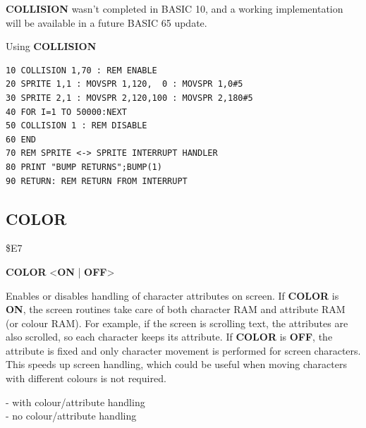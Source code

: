 \begin{description}[leftmargin=2cm,style=nextline]
\item [Info:] {\bf COLLISION} wasn't completed in BASIC 10, and
               a working implementation will be available in a future BASIC 65 update.


\item [Example:] Using {\bf COLLISION}
\begin{tcolorbox}[colback=black,coltext=white]
\verbatimfont{\codefont}
\begin{verbatim}
10 COLLISION 1,70 : REM ENABLE
20 SPRITE 1,1 : MOVSPR 1,120,  0 : MOVSPR 1,0#5
30 SPRITE 2,1 : MOVSPR 2,120,100 : MOVSPR 2,180#5
40 FOR I=1 TO 50000:NEXT
50 COLLISION 1 : REM DISABLE
60 END
70 REM SPRITE <-> SPRITE INTERRUPT HANDLER
80 PRINT "BUMP RETURNS";BUMP(1)
90 RETURN: REM RETURN FROM INTERRUPT
\end{verbatim}
\end{tcolorbox}
\end{description}


\newpage
\subsection{COLOR}
\begin{description}[leftmargin=2cm,style=nextline]
\item [Token:] \$E7
\item [Format:] {\bf COLOR} <{\bf ON} | {\bf OFF}>
\item [Usage:] Enables or disables
               handling of character attributes on screen.
               If {\bf COLOR} is {\bf ON}, the screen routines
               take care of both character RAM and attribute RAM (or colour RAM).
               For example, if the screen is scrolling text, the attributes
               are also scrolled, so each character keeps its attribute.
               If {\bf COLOR} is {\bf OFF}, the attribute
               is fixed and only character movement is performed
               for screen characters. This speeds up screen
               handling, which could be useful when moving characters with different colours is
               not required.
\item [Example:]  - with colour/attribute handling \\
                  - no colour/attribute handling

\end{description}

